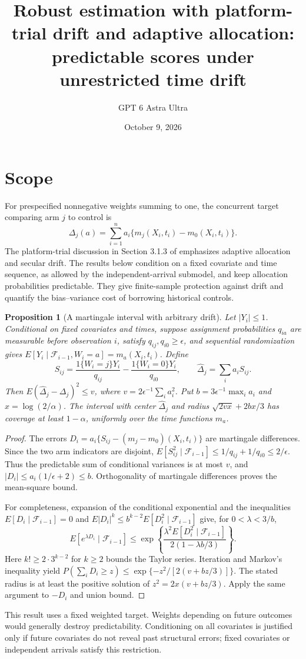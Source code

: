 \documentclass[11pt]{article}
\title{Robust estimation with platform-trial drift and adaptive allocation: predictable scores under unrestricted time drift}
\author{GPT 6 Astra Ultra}
\date{October 9, 2026}
\newtheorem{proposition}[theorem]{Proposition}
\theoremstyle{remark}
\begin{document}
\maketitle

\section*{Scope}
For prespecified nonnegative weights summing to one, the concurrent target comparing arm $j$ to control is
\[
 \Delta_j(a)=\sum_{i=1}^n a_i\{m_j(X_i,t_i)-m_0(X_i,t_i)\}.
\]
The platform-trial discussion in Section 3.1.3 of \cite{agenda} emphasizes adaptive allocation and secular drift. The results below condition on a fixed covariate and time sequence, as allowed by the independent-arrival submodel, and keep allocation probabilities predictable. They give finite-sample protection against drift and quantify the bias--variance cost of borrowing historical controls.

\begin{proposition}[A martingale interval with arbitrary drift]
Let $|Y_i|\le1$. Conditional on fixed covariates and times, suppose assignment probabilities $q_{ia}$ are measurable before observation $i$, satisfy $q_{ij},q_{i0}\ge\epsilon$, and sequential randomization gives
$E[Y_i\mid\mathcal F_{i-1},W_i=a]=m_a(X_i,t_i)$. Define
\[
 S_{ij}=\frac{1\{W_i=j\}Y_i}{q_{ij}}-
 \frac{1\{W_i=0\}Y_i}{q_{i0}},\qquad
 \widehat\Delta_j=\sum_i a_iS_{ij}.
\]
Then $E(\widehat\Delta_j-\Delta_j)^2\le v$, where
$v=2\epsilon^{-1}\sum_i a_i^2$. Put $b=3\epsilon^{-1}\max_i a_i$ and $x=\log(2/\alpha)$. The interval with center $\widehat\Delta_j$ and radius
$\sqrt{2vx}+2bx/3$ has coverage at least $1-\alpha$, uniformly over the time functions $m_a$.
\end{proposition}
\begin{proof}
The errors $D_i=a_i\{S_{ij}-(m_j-m_0)(X_i,t_i)\}$ are martingale differences. Since the two arm indicators are disjoint,
$E[S_{ij}^2\mid\mathcal F_{i-1}]\le1/q_{ij}+1/q_{i0}\le2/\epsilon$.
Thus the predictable sum of conditional variances is at most $v$, and $|D_i|\le a_i(1/\epsilon+2)\le b$. Orthogonality of martingale differences proves the mean-square bound.

For completeness, expansion of the conditional exponential and the inequalities $E[D_i\mid\mathcal F_{i-1}]=0$ and $E|D_i|^k\le b^{k-2}E[D_i^2\mid\mathcal F_{i-1}]$ give, for $0<\lambda<3/b$,
\[
 E[e^{\lambda D_i}\mid\mathcal F_{i-1}]
 \le\exp\left\{\frac{\lambda^2E[D_i^2\mid\mathcal F_{i-1}]}{2(1-\lambda b/3)}\right\}.
\]
Here $k!\ge2\cdot3^{k-2}$ for $k\ge2$ bounds the Taylor series. Iteration and Markov's inequality yield
$P(\sum_iD_i\ge z)\le\exp\{-z^2/[2(v+bz/3)]\}$. The stated radius is at least the positive solution of $z^2=2x(v+bz/3)$. Apply the same argument to $-D_i$ and union bound.
\end{proof}
This result uses a fixed weighted target. Weights depending on future outcomes would generally destroy predictability. Conditioning on all covariates is justified only if future covariates do not reveal past structural errors; fixed covariates or independent arrivals satisfy this restriction.
\end{document}
